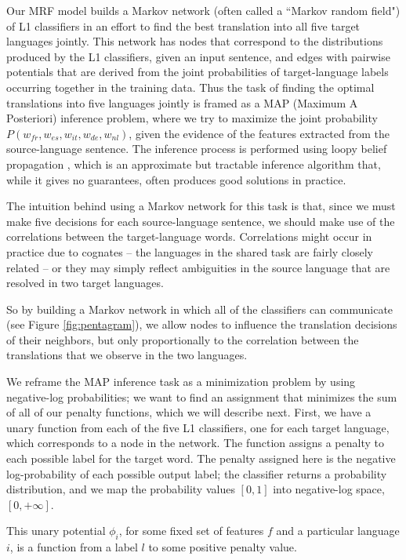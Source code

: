 \documentclass[11pt,letterpaper]{article}
\begin{document}
Our MRF model builds a Markov network (often called a ``Markov random
field") of L1 classifiers in an effort to find the best translation into
all five target languages jointly. This network has nodes that correspond to
the distributions produced by the L1 classifiers, given an input
sentence, and edges with pairwise potentials that are derived from the joint
probabilities of target-language labels occurring together in the training
data. 
Thus the task of finding the optimal translations into five languages jointly
is framed as a MAP (Maximum A Posteriori) inference problem, where we try to
maximize the joint probability $P(w_{fr},w_{es},w_{it},w_{de},w_{nl})$, given
the evidence of the features extracted from the source-language sentence. The
inference process is performed using loopy belief propagation
\cite{DBLP:conf/uai/MurphyWJ99}, which is an approximate but tractable
inference algorithm that, while it gives no guarantees, often produces good
solutions in practice.

The intuition behind using a Markov network for this task is that, since we
must make five decisions for each source-language sentence, we should make use
of the correlations between the target-language words. Correlations might occur
in practice due to cognates -- the languages in the shared task are fairly
closely related -- or they may simply reflect ambiguities in the source
language that are resolved in two target languages.

So by building a Markov network in which all of the classifiers can
communicate (see Figure \ref{fig:pentagram}), we allow nodes to influence the
translation decisions of their neighbors, but only proportionally to the
correlation between the translations that we observe in the two languages.

We reframe the MAP inference task as a minimization problem by using
negative-log probabilities; we want to find an assignment that minimizes the
sum of all of our penalty functions, which we will describe next.
First, we have a unary function from each of the five L1 classifiers, one for
each target language, which corresponds to a node in the network. The
function assigns a penalty to each possible label for the target word. The
penalty assigned here is the negative log-probability of each possible output
label; the classifier returns a probability distribution, and we map the
probability values $[0,1]$ into negative-log space, $[0, +\infty]$.

This unary potential $\phi_i$, for some fixed set of features $f$ and a
particular language $i$, is a function from a label $l$ to some positive
penalty value.
\end{document}

